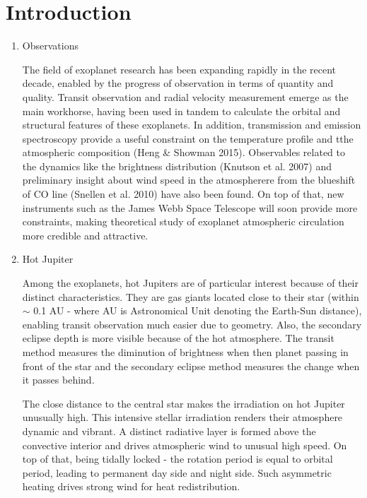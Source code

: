 \documentclass[11pt]{article}
\begin{document}
\section{Introduction}

\begin{enumerate}

\item Observations 

The field of exoplanet research has been expanding rapidly in the recent decade, enabled by the progress of observation in terms of quantity and quality. Transit observation and radial velocity measurement emerge as the main workhorse, having been used in tandem to calculate the orbital and structural features of these exoplanets. In addition, transmission and emission spectroscopy provide a useful constraint on the temperature profile and tthe atmospheric composition (Heng \& Showman 2015). Observables related to the dynamics like the brightness distribution (Knutson et al. 2007) and preliminary insight about wind speed in the atmospherere from the blueshift of CO line (Snellen et al. 2010) have also been found. On top of that, new instruments such as the James Webb Space Telescope will soon provide more constraints, making theoretical study of exoplanet atmospheric circulation more credible and attractive. 

\item Hot Jupiter

Among the exoplanets, hot Jupiters are of particular interest because of their distinct characteristics. They are gas giants located close to their star (within $\sim$ 0.1 AU - where AU is Astronomical Unit denoting the Earth-Sun distance), enabling transit observation much easier due to geometry. Also, the secondary eclipse depth is more visible because of the hot atmosphere.  The transit method measures the diminution of brightness when then planet passing in front of the star and the secondary eclipse method measures the change when it passes behind.

The close distance to the central star makes the irradiation on hot Jupiter unusually high. This intensive stellar irradiation renders their atmosphere dynamic and vibrant. A distinct radiative layer is formed above the convective interior and drives atmospheric wind to unusual high speed. On top of that, being tidally locked - the rotation period is equal to orbital period, leading to permanent day side and night side. Such asymmetric heating drives strong wind for heat redistribution. 


\end{enumerate}
\end{document}
